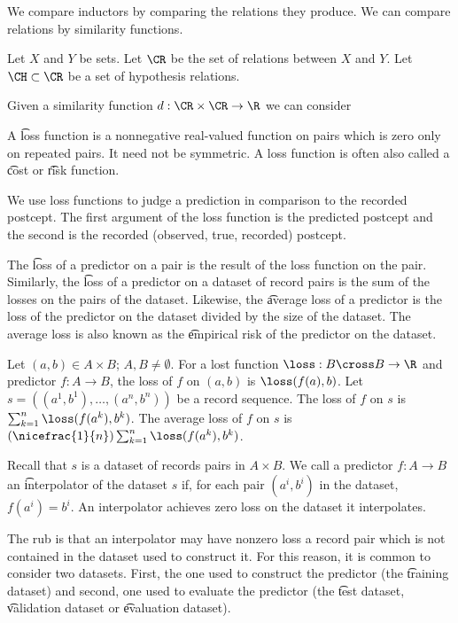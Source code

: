 

We compare inductors by comparing the relations they produce.
We can compare relations by similarity functions.


Let $X$ and $Y$ be sets.
Let $\CR$ be the set of relations between $X$ and $Y$.
Let $\CH \subset \CR$ be a set of hypothesis relations.

Given a similarity function $d: \CR \times \CR \to \R$ we can consider 

A \t{loss} function is a nonnegative real-valued function on pairs which is zero only on repeated pairs.
It need not be symmetric.
A loss function is often also called a \t{cost} or \t{risk} function.

We use loss functions to judge a prediction in comparison to the recorded postcept.
The first argument of the loss function is the predicted postcept and the second is the recorded (observed, true, recorded) postcept.

The \t{loss of a predictor on a pair} is the result of the loss function on the pair.
Similarly, the \t{loss of a predictor on a dataset} of record pairs is the sum of the losses on the pairs of the dataset.
Likewise, the \t{average loss} of a predictor is the loss of the predictor on the dataset divided by the size of the dataset.
The average loss is also known as the \t{empirical risk} of the predictor on the dataset.


Let $(a, b) \in A \times B$; $A, B \neq \emptyset$.
For a lost function $\loss: B \cross B \to \R$ and predictor $f: A \to B$, the loss of $f$ on $(a, b)$ is $\loss(f(a),b)$.
Let $s = ((a^1, b^1), \dots, (a^n, b^n))$
be a record sequence.
The loss of $f$ on $s$ is $\sum_{k = 1}^{n} \loss(f(a^k), b^k)$.
The average loss of $f$ on $s$ is $(\nicefrac{1}{n})\sum_{k = 1}^{n} \loss(f(a^k), b^k)$.


Recall that $s$ is a dataset of records pairs in $A \times B$.
We call a predictor $f: A \to B$ an \t{interpolator} of the dataset $s$ if, for each pair $(a^i, b^i)$ in the dataset, $f(a^i) = b^i$.
An interpolator achieves zero loss on the dataset it interpolates.

The rub is that an interpolator may have nonzero loss a record pair which is not contained in the dataset used to construct it.
For this reason, it is common to consider two datasets.
First, the one used to construct the predictor (the \t{training dataset}) and second, one used to evaluate the predictor (the \t{test dataset}, \t{validation dataset} or \t{evaluation dataset}).

